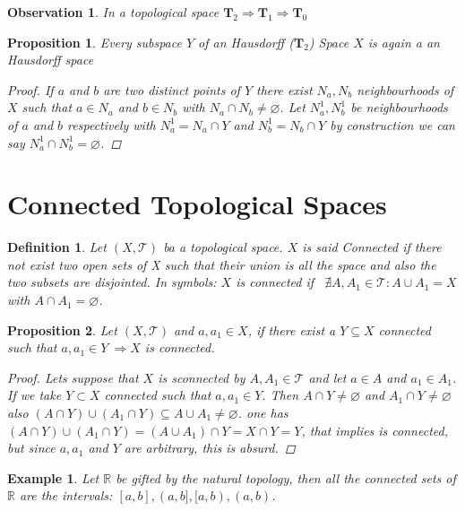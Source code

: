 \documentclass{article}
\newtheorem{proposition}{Proposition}
\newtheorem{definition}{Definition}
\newtheorem{example}{Example}
\newtheorem{obs}{Observation}
\begin{document}
            \begin{obs}
                In a topological space $\mathbf{T}_2 \Rightarrow \mathbf{T}_1 \Rightarrow \mathbf{T}_0$
            \end{obs}
            \begin{proposition}
                Every subspace $Y$ of an Hausdorff ($\mathbf{T}_2$) Space $X$ is again a an Hausdorff space
                \begin{proof}
                    If $a$ and $b$ are two distinct points of $Y$ there exist $N_a, N_b$ neighbourhoods of $X$ such that $a \in N_a$ and $b \in N_b$ with $N_a \cap N_b \neq \varnothing$.
                    Let $N_a^1, N_b^1$ be neighbourhoods of $a$ and $b$ respectively with $N_a^1 = N_a \cap Y$ and $N_b^1 = N_b \cap Y$ by construction we can say $N_a^1 \cap N_b^1 = \varnothing$.
                 \end{proof}
            \end{proposition}
        \newpage
        \section*{Connected Topological Spaces}
            \begin{definition}
                Let $(X, \mathcal{T})$ ba a topological space. $X$ is said Connected if there not exist two open sets of X such that their union is all the space and also the two subsets are disjointed.
                In symbols: $X$ is connected if \ $\nexists A, A_1 \in \mathcal{T}: A \cup A_1 = X$ with $A \cap A_1 = \varnothing$. 
            \end{definition}
            \begin{proposition}
                Let $(X,\mathcal{T})$ and $a,a_1 \in X$, if there exist a $Y \subseteq X$ connected such that $a,a_1 \in Y \ \Rightarrow X$ is connected. 
                \begin{proof}
                    Lets suppose that $X$ is sconnected by $A, A_1 \in \mathcal{T}$ and let $a\in A$ and $a_1 \in A_1$. If we take $Y \subset X$ connected such that $a,a_1 \in Y$. Then $A \cap Y \neq \varnothing$ and $A_1 \cap Y \neq \varnothing$ also $(A \cap Y) \cup (A_1 \cap Y) \subseteq A \cup A_1 \neq \varnothing$. one has $(A \cap Y) \cup (A_1 \cap Y) = (A \cup A_1) \cap Y = X \cap Y = Y$, that implies is connected, but since $a, a_1$ and $Y$ are arbitrary, this is absurd.
                \end{proof}
            \end{proposition}
            \begin{example}
                Let $\mathbb{R}$ be gifted by the natural topology, then all the connected sets of $\mathbb{R}$ are the intervals: $[a,b], (a,b], [a,b), (a,b)$.
            \end{example}
        \newpage
\end{document}
